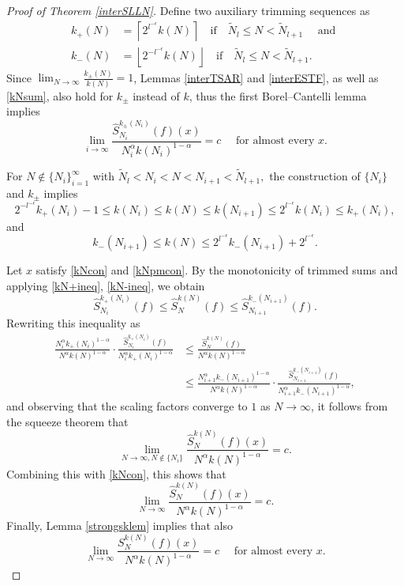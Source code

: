 \documentclass[11pt,twoside,a4paper,reqno]{amsart}
\begin{document}
\begin{proof}[Proof of Theorem \ref{interSLLN}]
Define two auxiliary trimming sequences as
\begin{align*}
k_+(N) &= \left\lceil 2^{l^{-\epsilon}} k(N) \right\rceil \quad \text{if}\quad \tilde{N}_l \leq N < \tilde{N}_{l+1} \quad \text{ and }\\
k_-(N) &= \left\lfloor 2^{-l^{-\epsilon}} k(N) \right\rfloor \quad \text{if}\quad \tilde{N}_l \leq N < \tilde{N}_{l+1}.
\end{align*}
Since $\lim_{N\rightarrow \infty} \frac{k_{\pm}(N)}{k(N)} = 1$, Lemmas \ref{interTSAR} and \ref{interESTF}, as well as \eqref{kNsum}, also hold for $k_\pm$ instead of $k$, thus the first Borel--Cantelli lemma implies
\begin{equation}\label{kNpmcon}
\lim_{i\rightarrow \infty} \frac{\hat{S}_{N_i}^{k_{\pm}(N_i)}(f)(x)}{N_i^{\alpha} k(N_i)^{1-\alpha}} = c \quad \text{ for almost every } x.
\end{equation}


For $N \notin \{N_i\}_{i=1}^\infty$ with $\tilde{N}_l<N_i<N<N_{i+1}<\tilde{N}_{l+1},$ the construction of $\{N_i\}$ and $k_\pm$ implies
\begin{equation}\label{kN+ineq}
2^{-l^{-\epsilon}} k_+(N_i)-1\leq k(N_i)\leq k(N)\leq k(N_{i+1})\leq 2^{l^{-\epsilon}} k(N_i) \leq k_+(N_i),
\end{equation}
and
\begin{equation}\label{kN-ineq}
k_-(N_{i+1}) \leq k(N) \leq 2^{l^{-\epsilon}} k_-(N_{i+1})+2^{l^{-\epsilon}}.
\end{equation}


Let $x$ satisfy \eqref{kNcon} and \eqref{kNpmcon}. By the monotonicity of trimmed sums and applying \eqref{kN+ineq}, \eqref{kN-ineq}, we obtain
$$
\hat{S}_{N_i}^{k_+(N_i)}(f) \leq \hat{S}_N^{k(N)}(f) \leq \hat{S}_{N_{i+1}}^{k_-(N_{i+1})}(f).$$
Rewriting this inequality as
\begin{align*}
\frac{N_i^{\alpha}k_+(N_i)^{1-\alpha}}{N^{\alpha}k(N)^{1-\alpha}}\cdot
\frac{\hat{S}_{N_i}^{k_+(N_i)}(f)}{N_i^{\alpha}k_+(N_i)^{1-\alpha}}&\leq \frac{\hat{S}_N^{k(N)}(f)}{N^{\alpha}k(N)^{1-\alpha}}\\
&\leq
\frac{N_{i+1}^{\alpha}k_-(N_{i+1})^{1-\alpha}}{N^{\alpha}k(N)^{1-\alpha}}\cdot
\frac{\hat{S}_{N_{i+1}}^{k_-(N_{i+1})}(f)}{N_{i+1}^{\alpha}k_-(N_{i+1})^{1-\alpha}},
\end{align*}
and observing that the scaling factors converge to $1$ as $N \to \infty$, it follows from the squeeze theorem that
\begin{equation*}
\lim_{N\rightarrow\infty, N \not \in \{N_i\}} \frac{\hat{S}_N^{k(N)}(f)(x)}{N^{\alpha} k(N)^{1-\alpha}}=c.
\end{equation*}
Combining this with \eqref{kNcon}, this shows that
\begin{equation*}
\lim_{N\rightarrow\infty} \frac{\hat{S}_N^{k(N)}(f)(x)}{N^{\alpha} k(N)^{1-\alpha}}=c.
\end{equation*}
Finally, Lemma \ref{strongsklem} implies that also
\begin{equation*}
\lim_{N\rightarrow\infty} \frac{S_N^{k(N)}(f)(x)}{N^{\alpha} k(N)^{1-\alpha}}=c\quad \text{ for almost every } x.
\end{equation*}
\end{proof}
\end{document}
